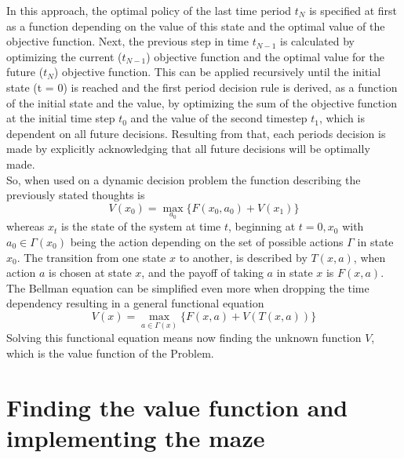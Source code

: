 \documentclass[conference]{IEEEtran}
\begin{document}
In this approach, the optimal policy of the last time period $t_N$ is specified at first as a function depending on the value of this state and the optimal value of the objective function.
Next, the previous step in time $t_{N-1}$ is calculated by optimizing the current ($t_{N-1}$) objective function and the optimal value for the future ($t_{N}$) objective function. This can be applied recursively until the initial state (t = 0) is reached and the first period decision rule is derived, as a function of the initial state and the value, by optimizing the sum of the objective function at the initial time step $t_{0}$ and the value of the second timestep $t_{1}$, which is dependent on all future decisions. Resulting from that, each periods decision is made by explicitly acknowledging that all future decisions will be optimally made.\\
So, when used on a dynamic decision problem the function describing the previously stated thoughts is
\begin{equation}
V(x_0) = \max_{a_0} \{F(x_0, a_0) + V(x_1)\}
\end{equation}
whereas $x_t$ is the state of the system at time $t$, beginning at $t = 0, x_0$ with
$a_0 \in \Gamma(x_0)$ being the action depending on the set of possible actions $\Gamma$ in state $x_0$.
The transition from one state $x$ to another, is described by $T(x,a)$, when action $a$ is chosen at state $x$, and the payoff of taking $a$ in state $x$ is $F(x,a)$.
The Bellman equation can be simplified even more when dropping the time dependency resulting in a general functional equation
\begin{equation}
V(x) = \max_{a \in \Gamma(x)} \{F(x,a) + V(T(x,a))\}
\end{equation}
Solving this functional equation means now finding the unknown function $V$, which is the value function of the Problem. \cite{Bellman.2013}
\\

\section{Finding the value function and implementing the maze}
\end{document}
